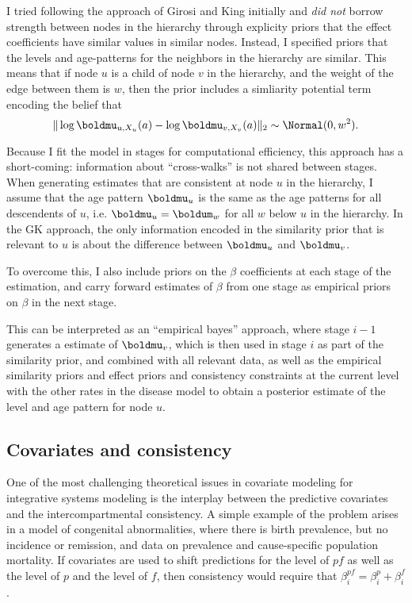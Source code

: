 I tried following the approach of Girosi and King initially and \emph{did not} borrow strength
between nodes in the hierarchy through explicity priors that the effect coefficients
have similar values in similar nodes.  Instead, I specified priors
that the levels and age-patterns for the neighbors in the
hierarchy are similar.  This means that if node
$u$ is a child of node $v$ in the hierarchy, and the weight of the
edge between them is $w$, then the prior includes a simliarity
potential term encoding the belief that
\[
\| \log \boldmu_{u,X_u}(a) - \log \boldmu_{v,X_v}(a)\|_2 \sim \Normal(0, w^2).
\]

Because I fit the model in stages for computational efficiency, this
approach has a short-coming: information about ``cross-walks'' is not
shared between stages.  When generating estimates that are consistent
at node $u$ in the hierarchy, I assume that the age pattern
$\boldmu_u$ is the same as the age patterns for all descendents of
$u$, i.e. $\boldmu_u = \boldum_w$ for all $w$ below $u$ in the
hierarchy.  In the GK approach, the only information encoded in the similarity
prior that is relevant to $u$ is about the difference between
$\boldmu_u$ and $\boldmu_v$.

To overcome this, I also include priors on the $\beta$ coefficients at
each stage of the estimation, and carry forward estimates of $\beta$
from one stage as empirical priors on $\beta$ in the next stage.

This can be interpreted as an ``empirical bayes'' approach, where
stage $i-1$ generates a estimate of $\boldmu_v$, which is then used in
stage $i$ as part of the similarity prior, and combined with all
relevant data, as well as the empirical similarity priors and effect
priors and consistency constraints at the current level with the other
rates in the disease model to obtain a posterior estimate of the level
and age pattern for node $u$.

\subsection{Covariates and consistency}
One of the most challenging theoretical issues in covariate modeling
for integrative systems modeling is the interplay between the
predictive covariates and the intercompartmental consistency.  A
simple example of the problem arises in a model of congenital
abnormalities, where there is birth prevalence, but no incidence or
remission, and data on prevalence and cause-specific population
mortality. If covariates are used to shift predictions for the level
of $pf$ as well as the level of $p$ and the level of $f$, then
consistency would require that $\beta^{pf}_i = \beta^p_i + \beta^f_i$.

